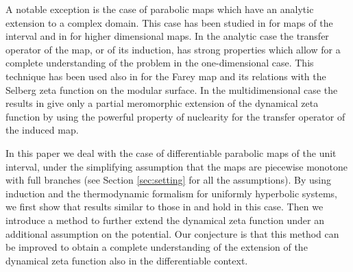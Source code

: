 \documentclass[11pt]{amsart}
\theoremstyle{definition}
\theoremstyle{remark}
\theoremstyle{definition}
\numberwithin{equation}{section}
\begin{document}
A notable exception is the case of parabolic maps which have an analytic extension to a complex domain. This case has been studied in \cite{Ru} for maps of the interval and in \cite{PY} for higher dimensional maps. In the analytic case the transfer operator of the map, or of its induction, has strong properties which allow for a complete understanding of the problem in the one-dimensional case. This technique has been used also in \cite{BI} for the Farey map and its relations with the Selberg zeta function on the modular surface. In the multidimensional case the results in \cite{PY} give only a partial meromorphic extension of the dynamical zeta function by using the powerful property of nuclearity for the transfer operator of the induced map.

In this paper we deal with the case of differentiable parabolic maps of the unit interval, under the simplifying assumption that the maps are piecewise monotone with full branches (see Section \ref{sec:setting} for all the assumptions). By using induction and the thermodynamic formalism for uniformly hyperbolic systems, we first show that results similar to those in \cite{Is2} and \cite{PY} hold in this case. Then we introduce a method to further extend the dynamical zeta function under an additional assumption on the potential. Our conjecture is that this method can be improved to obtain a complete understanding of the extension of the dynamical zeta function also in the differentiable context.

\end{document}
